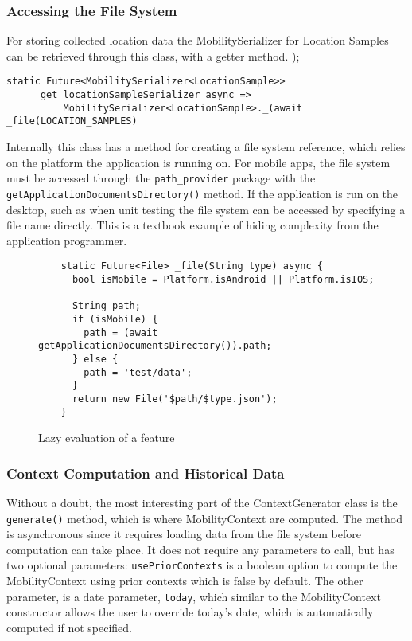 \subsubsection{Accessing the File System}
For storing collected location data the MobilitySerializer for Location Samples can be retrieved through this class, with a getter method. 
);
\begin{verbatim}
static Future<MobilitySerializer<LocationSample>>
      get locationSampleSerializer async =>
          MobilitySerializer<LocationSample>._(await _file(LOCATION_SAMPLES)
\end{verbatim}

Internally this class has a method for creating a file system reference, which relies on the platform the application is running on. For mobile apps, the file system must be accessed through the \verb|path_provider| package with the \verb|getApplicationDocumentsDirectory()| method. If the application is run on the desktop, such as when unit testing the file system can be accessed by specifying a file name directly. This is a textbook example of hiding complexity from the application programmer.

\begin{figure}
    \centering
    \begin{verbatim}
    static Future<File> _file(String type) async {
      bool isMobile = Platform.isAndroid || Platform.isIOS;
    
      String path;
      if (isMobile) {
        path = (await getApplicationDocumentsDirectory()).path;
      } else {
        path = 'test/data';
      }
      return new File('$path/$type.json');
    }
    \end{verbatim}
    \caption{Lazy evaluation of a feature}
    \label{fig:lazy-evaluation}
\end{figure}

\subsubsection{Context Computation and Historical Data}
Without a doubt, the most interesting part of the ContextGenerator class is the \verb|generate()| method, which is where MobilityContext are computed. The method is asynchronous since it requires loading data from the file system before computation can take place. It does not require any parameters to call, but has two optional parameters: \verb|usePriorContexts| is a boolean option to compute the MobilityContext using prior contexts which is false by default. The other parameter, is a date parameter, \verb|today|, which similar to the MobilityContext constructor allows the user to override today's date, which is automatically computed if not specified.

